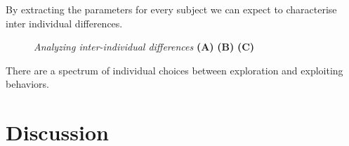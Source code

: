 \documentclass[profile,final,english, draft]{article}%
\begin{document}
By extracting the parameters for every subject we can expect to characterise inter individual differences. 

\begin{figure}%
\caption{\emph{Analyzing inter-individual differences} \textbf{(A)} 
\textbf{(B)} 
\textbf{(C)}  }
\label{fig:results_psycho_inter}
\end{figure}

There are a spectrum of individual choices between exploration and exploiting behaviors.



\section{Discussion}
\end{document}
